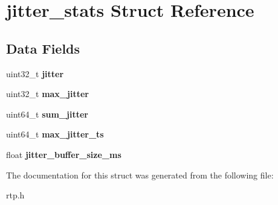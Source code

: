 \section{jitter\+\_\+stats Struct Reference}
\label{structjitter__stats}
\subsection*{Data Fields}
\begin{DoxyCompactItemize}
\item 
\mbox{\label{structjitter__stats_a81d4ba59f4cc1192bf793b39bce6d1a5}} 
uint32\+\_\+t {\bfseries jitter}
\item 
\mbox{\label{structjitter__stats_a88405df698634f09be3c1d19110e3f87}} 
uint32\+\_\+t {\bfseries max\+\_\+jitter}
\item 
\mbox{\label{structjitter__stats_ac64612dce9e16462ad490610c2cf7959}} 
uint64\+\_\+t {\bfseries sum\+\_\+jitter}
\item 
\mbox{\label{structjitter__stats_afdbd8646255043118eea0218a91c827e}} 
uint64\+\_\+t {\bfseries max\+\_\+jitter\+\_\+ts}
\item 
\mbox{\label{structjitter__stats_a8bc98e795713873d7fab16ed553c7d69}} 
float {\bfseries jitter\+\_\+buffer\+\_\+size\+\_\+ms}
\end{DoxyCompactItemize}


The documentation for this struct was generated from the following file\+:\begin{DoxyCompactItemize}
\item 
rtp.\+h\end{DoxyCompactItemize}
